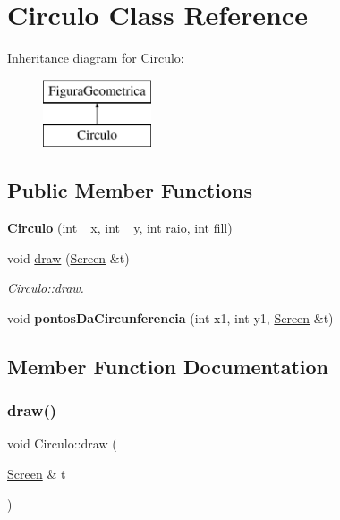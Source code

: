 \hypertarget{class_circulo}{}\section{Circulo Class Reference}
\label{class_circulo}
Inheritance diagram for Circulo\+:\begin{figure}[H]
\begin{center}
\leavevmode
\includegraphics[height=2.000000cm]{class_circulo}
\end{center}
\end{figure}
\subsection*{Public Member Functions}
\begin{DoxyCompactItemize}
\item 
\mbox{\label{class_circulo_a3d5f277619ed35f4a8cd455dd1510a20}} 
{\bfseries Circulo} (int \+\_\+x, int \+\_\+y, int raio, int fill)
\item 
void \mbox{\hyperlink{class_circulo_a593787d6e0618c2eded23e8839e7bea6}{draw}} (\mbox{\hyperlink{class_screen}{Screen}} \&t)
\begin{DoxyCompactList}\small\item\em \mbox{\hyperlink{class_circulo_a593787d6e0618c2eded23e8839e7bea6}{Circulo\+::draw}}. \end{DoxyCompactList}\item 
\mbox{\label{class_circulo_a197439e429d6636a4a43d77e02b20486}} 
void {\bfseries pontos\+Da\+Circunferencia} (int x1, int y1, \mbox{\hyperlink{class_screen}{Screen}} \&t)
\end{DoxyCompactItemize}


\subsection{Member Function Documentation}
\mbox{\label{class_circulo_a593787d6e0618c2eded23e8839e7bea6}} 
\subsubsection{\texorpdfstring{draw()}{draw()}}
{\footnotesize\ttfamily void Circulo\+::draw (\begin{DoxyParamCaption}\item[{\mbox{\hyperlink{class_screen}{Screen}} \&}]{t }\end{DoxyParamCaption})\hspace{0.3cm}{\ttfamily [virtual]}}



